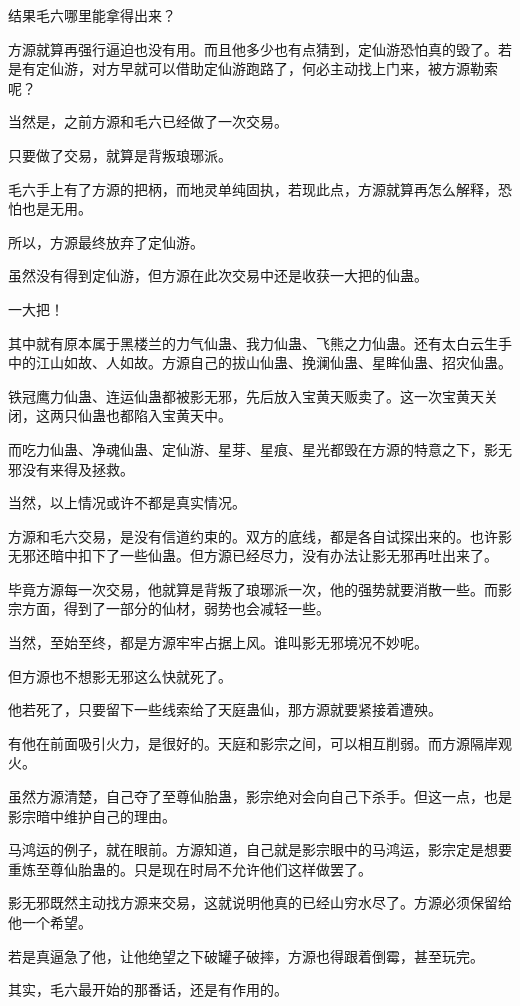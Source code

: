 \begin{this_body}
结果毛六哪里能拿得出来？

方源就算再强行逼迫也没有用。而且他多少也有点猜到，定仙游恐怕真的毁了。若是有定仙游，对方早就可以借助定仙游跑路了，何必主动找上门来，被方源勒索呢？

当然是，之前方源和毛六已经做了一次交易。

只要做了交易，就算是背叛琅琊派。

毛六手上有了方源的把柄，而地灵单纯固执，若现此点，方源就算再怎么解释，恐怕也是无用。

所以，方源最终放弃了定仙游。

虽然没有得到定仙游，但方源在此次交易中还是收获一大把的仙蛊。

一大把！

其中就有原本属于黑楼兰的力气仙蛊、我力仙蛊、飞熊之力仙蛊。还有太白云生手中的江山如故、人如故。方源自己的拔山仙蛊、挽澜仙蛊、星眸仙蛊、招灾仙蛊。

铁冠鹰力仙蛊、连运仙蛊都被影无邪，先后放入宝黄天贩卖了。这一次宝黄天关闭，这两只仙蛊也都陷入宝黄天中。

而吃力仙蛊、净魂仙蛊、定仙游、星芽、星痕、星光都毁在方源的特意之下，影无邪没有来得及拯救。

当然，以上情况或许不都是真实情况。

方源和毛六交易，是没有信道约束的。双方的底线，都是各自试探出来的。也许影无邪还暗中扣下了一些仙蛊。但方源已经尽力，没有办法让影无邪再吐出来了。

毕竟方源每一次交易，他就算是背叛了琅琊派一次，他的强势就要消散一些。而影宗方面，得到了一部分的仙材，弱势也会减轻一些。

当然，至始至终，都是方源牢牢占据上风。谁叫影无邪境况不妙呢。

但方源也不想影无邪这么快就死了。

他若死了，只要留下一些线索给了天庭蛊仙，那方源就要紧接着遭殃。

有他在前面吸引火力，是很好的。天庭和影宗之间，可以相互削弱。而方源隔岸观火。

虽然方源清楚，自己夺了至尊仙胎蛊，影宗绝对会向自己下杀手。但这一点，也是影宗暗中维护自己的理由。

马鸿运的例子，就在眼前。方源知道，自己就是影宗眼中的马鸿运，影宗定是想要重炼至尊仙胎蛊的。只是现在时局不允许他们这样做罢了。

影无邪既然主动找方源来交易，这就说明他真的已经山穷水尽了。方源必须保留给他一个希望。

若是真逼急了他，让他绝望之下破罐子破摔，方源也得跟着倒霉，甚至玩完。

其实，毛六最开始的那番话，还是有作用的。

\end{this_body}

